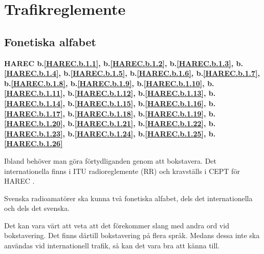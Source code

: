 \chapter{Trafikreglemente}

\section{Fonetiska alfabet}
\textbf{
HAREC b.\ref{HAREC.b.1.1}\label{myHAREC.b.1.1},
 b.\ref{HAREC.b.1.2}\label{myHAREC.b.1.2},
 b.\ref{HAREC.b.1.3}\label{myHAREC.b.1.3},
 b.\ref{HAREC.b.1.4}\label{myHAREC.b.1.4},
 b.\ref{HAREC.b.1.5}\label{myHAREC.b.1.5},
 b.\ref{HAREC.b.1.6}\label{myHAREC.b.1.6},
 b.\ref{HAREC.b.1.7}\label{myHAREC.b.1.7},
 b.\ref{HAREC.b.1.8}\label{myHAREC.b.1.8},
 b.\ref{HAREC.b.1.9}\label{myHAREC.b.1.9},
 b.\ref{HAREC.b.1.10}\label{myHAREC.b.1.10},
 b.\ref{HAREC.b.1.11}\label{myHAREC.b.1.11},
 b.\ref{HAREC.b.1.12}\label{myHAREC.b.1.12},
 b.\ref{HAREC.b.1.13}\label{myHAREC.b.1.13},
 b.\ref{HAREC.b.1.14}\label{myHAREC.b.1.14},
 b.\ref{HAREC.b.1.15}\label{myHAREC.b.1.15},
 b.\ref{HAREC.b.1.16}\label{myHAREC.b.1.16},
 b.\ref{HAREC.b.1.17}\label{myHAREC.b.1.17},
 b.\ref{HAREC.b.1.18}\label{myHAREC.b.1.18},
 b.\ref{HAREC.b.1.19}\label{myHAREC.b.1.19},
 b.\ref{HAREC.b.1.20}\label{myHAREC.b.1.20},
 b.\ref{HAREC.b.1.21}\label{myHAREC.b.1.21},
 b.\ref{HAREC.b.1.22}\label{myHAREC.b.1.22},
 b.\ref{HAREC.b.1.23}\label{myHAREC.b.1.23},
 b.\ref{HAREC.b.1.24}\label{myHAREC.b.1.24},
 b.\ref{HAREC.b.1.25}\label{myHAREC.b.1.25},
 b.\ref{HAREC.b.1.26}\label{myHAREC.b.1.26}
}

Ibland behöver man göra förtydliganden genom att bokstavera.
Det internationella finns i ITU radioreglemente (RR) \cite[Appendix 14]{ITU-RR}
och kravställs i CEPT för HAREC \cite[Annex 6]{TR6102}.

Svenska radioamatörer ska kunna två fonetiska alfabet, dels det
internationella och dels det svenska.

Det kan vara värt att veta att det förekommer slang med andra ord vid
bokstavering.
Det finns därtill bokstavering på flera språk.
Medans dessa inte ska användas vid internationell trafik, så kan det vara bra
att känna till.

